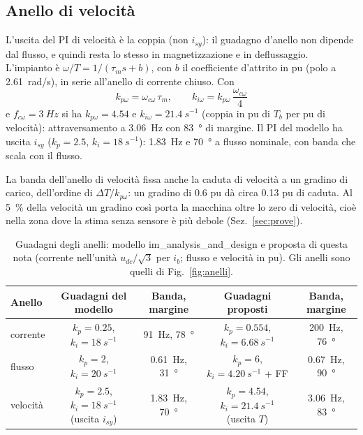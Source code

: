 \documentclass[10pt,a4paper]{scrartcl}
\newcommand{\taum}{\tau_m}
\begin{document}
\begin{onehalfspace}
\subsection{Anello di velocità}
\label{sec:anellovelocita}

L'uscita del PI di velocità è la coppia (non $i_{sy}$): il guadagno d'anello non dipende dal flusso, e quindi resta lo stesso in magnetizzazione e in deflussaggio. L'impianto è $\omega/T = 1/(\taum s + b)$, con $b$ il coefficiente d'attrito in pu (polo a \SI{2.61}{rad/s}), in serie all'anello di corrente chiuso. Con
\begin{equation}
k_{p\omega} = \omega_{c\omega}\,\taum, \qquad k_{i\omega} = k_{p\omega}\,\frac{\omega_{c\omega}}{4}
\label{eq:piw}
\end{equation}
e $f_{c\omega} = \SI{3}{Hz}$ si ha $k_{p\omega} = \num{4.54}$ e $k_{i\omega} = \SI{21.4}{s^{-1}}$ (coppia in pu di $T_b$ per pu di velocità): attraversamento a \SI{3.06}{Hz} con \SI{83}{\degree} di margine. Il PI del modello ha uscita $i_{sy}$ ($k_p = \num{2.5}$, $k_i = \SI{18}{s^{-1}}$): \SI{1.83}{Hz} e \SI{70}{\degree} a flusso nominale, con banda che scala con il flusso.

La banda dell'anello di velocità fissa anche la caduta di velocità a un gradino di carico, dell'ordine di $\Delta T/k_{p\omega}$: un gradino di \num{0.6} pu dà circa \num{0.13} pu di caduta. Al \SI{5}{\percent} della velocità un gradino così porta la macchina oltre lo zero di velocità, cioè nella zona dove la stima senza sensore è più debole (Sez.~\ref{sec:prove}).

\begin{table}[H]
\centering\small
\begin{tabular}{@{}lcccc@{}}
\toprule
Anello & Guadagni del modello & Banda, margine & Guadagni proposti & Banda, margine \\
\midrule
corrente & $k_p = \num{0.25}$, $k_i = \SI{18}{s^{-1}}$ & \SI{91}{Hz}, \SI{78}{\degree} & $k_p = \num{0.554}$, $k_i = \SI{6.68}{s^{-1}}$ & \SI{200}{Hz}, \SI{76}{\degree} \\
flusso & $k_p = 2$, $k_i = \SI{20}{s^{-1}}$ & \SI{0.61}{Hz}, \SI{31}{\degree} & $k_p = 6$, $k_i = \SI{4.20}{s^{-1}}$ + FF & \SI{0.67}{Hz}, \SI{90}{\degree} \\
velocità & $k_p = \num{2.5}$, $k_i = \SI{18}{s^{-1}}$ (uscita $i_{sy}$) & \SI{1.83}{Hz}, \SI{70}{\degree} & $k_p = \num{4.54}$, $k_i = \SI{21.4}{s^{-1}}$ (uscita $T$) & \SI{3.06}{Hz}, \SI{83}{\degree} \\
\bottomrule
\end{tabular}
\caption{Guadagni degli anelli: modello im\_analysis\_and\_design e proposta di questa nota (corrente nell'unità $u_{dc}/\sqrt3$ per $i_b$; flusso e velocità in pu). Gli anelli sono quelli di Fig.~\ref{fig:anelli}.}
\label{tab:guadagni}
\end{table}


\end{onehalfspace}
\end{document}
